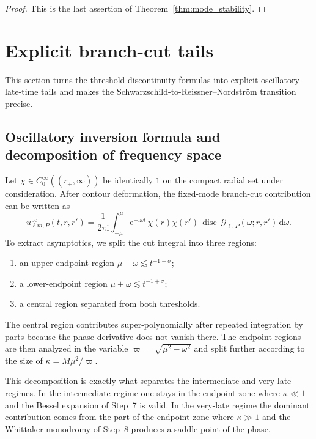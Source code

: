\documentclass[12pt]{article}
\numberwithin{equation}{section}
\theoremstyle{plain}
\theoremstyle{definition}
\theoremstyle{remark}
\newcommand{\ii}{\mathrm i}
\newcommand{\ee}{\mathrm e}
\newcommand{\dd}{\mathrm d}
\newcommand{\disc}{\operatorname{disc}}
\newcommand{\bc}{\mathrm{bc}}
\newcommand{\cG}{\mathcal G}
\newcommand{\om}{\omega}
\newcommand{\vp}{\varpi}
\newcommand{\kap}{\kappa}
\begin{document}
\begin{proof}
This is the last assertion of Theorem~\ref{thm:mode_stability}.
\end{proof}

\section{Explicit branch-cut tails}\label{sec:threshold_to_time}

This section turns the threshold discontinuity formulas into explicit oscillatory late-time tails and makes the Schwarzschild-to-Reissner--Nordstr\"om transition precise.


\subsection{Oscillatory inversion formula and decomposition of frequency space}

Let $\chi\in C_0^\infty((r_+,\infty))$ be identically $1$ on the compact radial set under consideration.  After contour deformation, the fixed-mode branch-cut contribution can be written as
\begin{equation}\label{eq:bc_formula_extended}
   u_{\ell m,P}^{\bc}(t,r,r')
   =
   \frac{1}{2\pi\ii}
   \int_{-\mu}^{\mu}
      \ee^{-\ii\om t}\,
      \chi(r)\chi(r')\,
      \disc\,\cG_{\ell,P}(\om;r,r')
   \,\dd\om.
\end{equation}
To extract asymptotics, we split the cut integral into three regions:
\begin{enumerate}[label=\textnormal{(\roman*)}]
   \item an upper-endpoint region $\mu-\om\lesssim t^{-1+\sigma}$;
   \item a lower-endpoint region $\mu+\om\lesssim t^{-1+\sigma}$;
   \item a central region separated from both thresholds.
\end{enumerate}
The central region contributes super-polynomially after repeated integration by parts because the phase derivative does not vanish there.  The endpoint regions are then analyzed in the variable $\vp=\sqrt{\mu^2-\om^2}$ and split further according to the size of $\kap=M\mu^2/\vp$.

This decomposition is exactly what separates the intermediate and very-late regimes.  In the intermediate regime one stays in the endpoint zone where $\kap\ll1$ and the Bessel expansion of Step~7 is valid.  In the very-late regime the dominant contribution comes from the part of the endpoint zone where $\kap\gg1$ and the Whittaker monodromy of Step~8 produces a saddle point of the phase.
\end{document}
